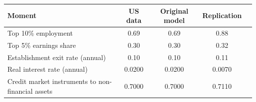 \begin{tabular}{l c c c c}
\hline
Moment & US data & Original model & Replication \\
\hline
Top 10\% employment & 0.69 & 0.69 & 0.88  \\
Top 5\% earnings share & 0.30 & 0.30 & 0.32   \\
Establishment exit rate (annual) & 0.10 & 0.10 & 0.11   \\
Real interest rate (annual) & 0.0200 & 0.0200 & 0.0070  \\
Credit market instruments to non-financial assets & 0.7000 & 0.7000 & 0.7110  \\
\hline
\end{tabular}
